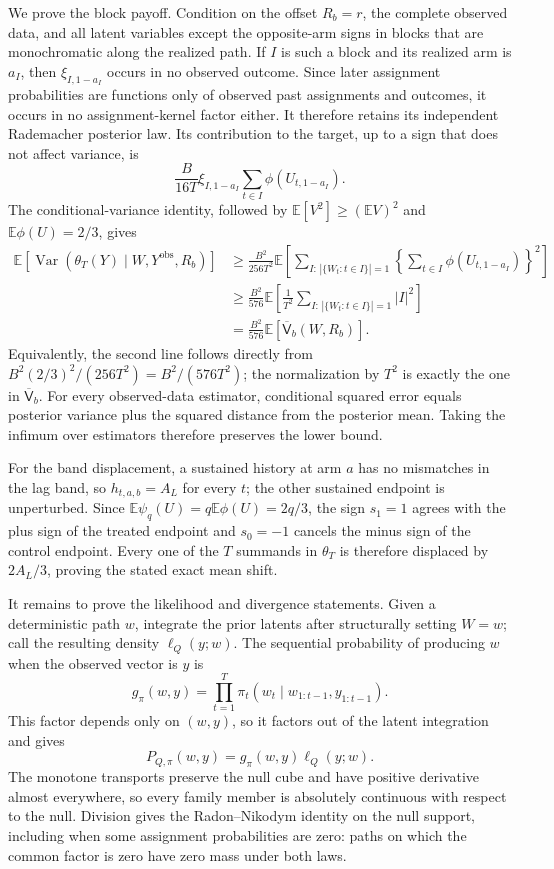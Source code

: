 We prove the block payoff.  Condition on the offset \(R_b=r\), the complete observed data, and all latent variables except the opposite-arm signs in blocks that are monochromatic along the realized path.  If \(I\) is such a block and its realized arm is \(a_I\), then \(\xi_{I,1-a_I}\) occurs in no observed outcome.  Since later assignment probabilities are functions only of observed past assignments and outcomes, it occurs in no assignment-kernel factor either.  It therefore retains its independent Rademacher posterior law.  Its contribution to the target, up to a sign that does not affect variance, is
\[
 \frac{B}{16T}\xi_{I,1-a_I}
 \sum_{t\in I}\phi(U_{t,1-a_I}).
\]
The conditional-variance identity, followed by \(\mathbb E[V^2]\ge(\mathbb EV)^2\) and \(\mathbb E\phi(U)=2/3\), gives
\[
 \begin{aligned}
 \mathbb E\!\left[
 \operatorname{Var}(\theta_T(Y)\mid W,Y^{\mathrm{obs}},R_b)
 \right]
 &\ge \frac{B^2}{256T^2}
 \mathbb E\!\left[
 \sum_{I:\,|\{W_t:t\in I\}|=1}
 \left\{\sum_{t\in I}\phi(U_{t,1-a_I})\right\}^2
 \right]\\
 &\ge \frac{B^2}{576}
 \mathbb E\!\left[
 \frac1{T^2}\sum_{I:\,|\{W_t:t\in I\}|=1}|I|^2
 \right]\\
 &=\frac{B^2}{576}
 \mathbb E[\overline{\mathsf V}_b(W,R_b)].
 \end{aligned}
\]
Equivalently, the second line follows directly from
\(B^2(2/3)^2/(256T^2)=B^2/(576T^2)\); the normalization by \(T^2\) is exactly the one in \(\overline{\mathsf V}_b\).  For every observed-data estimator, conditional squared error equals posterior variance plus the squared distance from the posterior mean.  Taking the infimum over estimators therefore preserves the lower bound.

For the band displacement, a sustained history at arm \(a\) has no mismatches in the lag band, so \(h_{t,a,b}=A_L\) for every \(t\); the other sustained endpoint is unperturbed.  Since \(\mathbb E\psi_q(U)=q\mathbb E\phi(U)=2q/3\), the sign \(s_1=1\) agrees with the plus sign of the treated endpoint and \(s_0=-1\) cancels the minus sign of the control endpoint.  Every one of the \(T\) summands in \(\theta_T\) is therefore displaced by \(2A_L/3\), proving the stated exact mean shift.

It remains to prove the likelihood and divergence statements.  Given a deterministic path \(w\), integrate the prior latents after structurally setting \(W=w\); call the resulting density \(\ell_Q(y;w)\).  The sequential probability of producing \(w\) when the observed vector is \(y\) is
\[
 g_\pi(w,y)=\prod_{t=1}^T
 \pi_t(w_t\mid w_{1:t-1},y_{1:t-1}).
\]
This factor depends only on \((w,y)\), so it factors out of the latent integration and gives
\[
 P_{Q,\pi}(w,y)=g_\pi(w,y)\ell_Q(y;w).
\]
The monotone transports preserve the null cube and have positive derivative almost everywhere, so every family member is absolutely continuous with respect to the null.  Division gives the Radon--Nikodym identity on the null support, including when some assignment probabilities are zero: paths on which the common factor is zero have zero mass under both laws.

